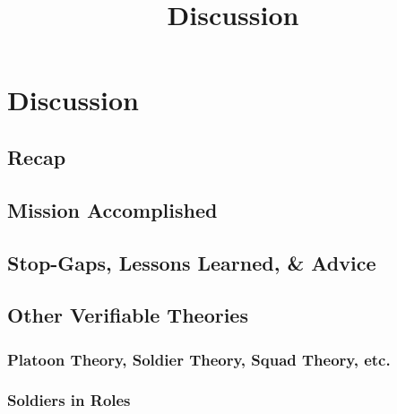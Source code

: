 \documentclass[../../main/main.tex]{subfiles}
\begin{document}
\title{Discussion}

\chapter{Discussion}\label{chp:discussion}

\section{Recap}\label{recap}

\section{Mission Accomplished}\label{missionaccomplished}

\section{Stop-Gaps, Lessons Learned, \& Advice}\label{stopgap}

\section{Other Verifiable Theories}\label{otherTheories}

\subsection{Platoon Theory, Soldier Theory, Squad Theory, etc.}
\subsection{Soldiers in Roles}
\end{document}

